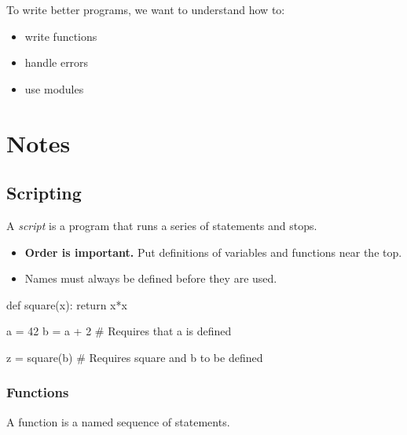 \documentclass[
  letterpaper,
  DIV=11,
  numbers=noendperiod]{scrreprt}
\newenvironment{Shaded}{\begin{snugshade}}{\end{snugshade}}
\newcommand{\CommentTok}[1]{\textcolor[rgb]{0.37,0.37,0.37}{#1}}
\newcommand{\ControlFlowTok}[1]{\textcolor[rgb]{0.00,0.46,0.62}{#1}}
\newcommand{\DecValTok}[1]{\textcolor[rgb]{0.68,0.00,0.00}{#1}}
\newcommand{\KeywordTok}[1]{\textcolor[rgb]{0.00,0.46,0.62}{#1}}
\newcommand{\NormalTok}[1]{\textcolor[rgb]{0.00,0.46,0.62}{#1}}
\newcommand{\OperatorTok}[1]{\textcolor[rgb]{0.37,0.37,0.37}{#1}}
\providecommand{\tightlist}{%
  \setlength{\itemsep}{0pt}\setlength{\parskip}{0pt}}
\begin{document}
To write better programs, we want to understand how to:

\begin{itemize}
\tightlist
\item
  write functions
\item
  handle errors
\item
  use modules
\end{itemize}

\hypertarget{notes-2}{%
\chapter{Notes}\label{notes-2}}

\hypertarget{scripting}{%
\section{Scripting}\label{scripting}}

A \emph{script} is a program that runs a series of statements and stops.

\begin{itemize}
\tightlist
\item
  \textbf{Order is important.} Put definitions of variables and
  functions near the top.
\item
  Names must always be defined before they are used.
\end{itemize}

\begin{Shaded}
\begin{Highlighting}[]
\KeywordTok{def}\NormalTok{ square(x):}
    \ControlFlowTok{return}\NormalTok{ x}\OperatorTok{*}\NormalTok{x}

\NormalTok{a }\OperatorTok{=} \DecValTok{42}
\NormalTok{b }\OperatorTok{=}\NormalTok{ a }\OperatorTok{+} \DecValTok{2}     \CommentTok{\# Requires that \textasciigrave{}a\textasciigrave{} is defined}

\NormalTok{z }\OperatorTok{=}\NormalTok{ square(b) }\CommentTok{\# Requires \textasciigrave{}square\textasciigrave{} and \textasciigrave{}b\textasciigrave{} to be defined}
\end{Highlighting}
\end{Shaded}

\hypertarget{functions-1}{%
\subsection{Functions}\label{functions-1}}

A function is a named sequence of statements.
\end{document}
